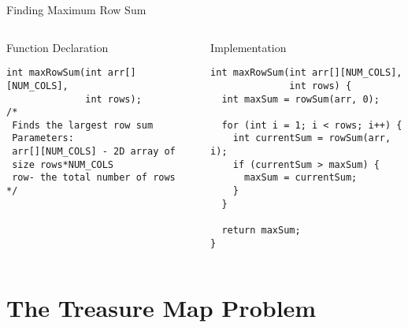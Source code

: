 \documentclass{beamer}
\begin{document}
\begin{frame}{Finding Maximum Row Sum}
    \begin{columns}
        \begin{column}{0.48\textwidth}
            \begin{block}{Function Declaration}
                \begin{lstlisting}[basicstyle=\ttfamily\footnotesize]
int maxRowSum(int arr[][NUM_COLS], 
              int rows);
/*
 Finds the largest row sum
 Parameters:
 arr[][NUM_COLS] - 2D array of 
 size rows*NUM_COLS
 row- the total number of rows
*/
                \end{lstlisting}
            \end{block}
        \end{column}
        \begin{column}{0.48\textwidth}
            \begin{block}{Implementation}
                \begin{lstlisting}[basicstyle=\ttfamily\footnotesize]
int maxRowSum(int arr[][NUM_COLS], 
              int rows) {
  int maxSum = rowSum(arr, 0);
  
  for (int i = 1; i < rows; i++) {
    int currentSum = rowSum(arr, i);
    if (currentSum > maxSum) {
      maxSum = currentSum;
    }
  }
  
  return maxSum;
}
                \end{lstlisting}
            \end{block}
        \end{column}
    \end{columns}
\end{frame}

\section{The Treasure Map Problem}
\end{document}
